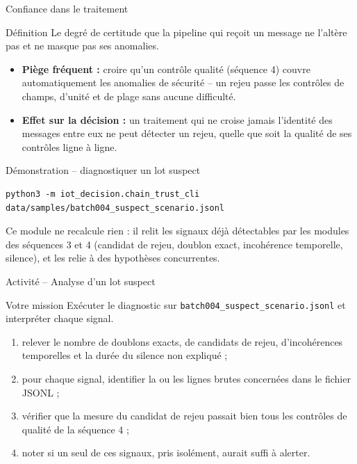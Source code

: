 \documentclass[aspectratio=169]{beamer}
\begin{document}
\begin{frame}{Confiance dans le traitement}
  \begin{block}{Définition}
    Le degré de certitude que la pipeline qui reçoit un message ne l'altère pas et ne masque pas ses anomalies.
  \end{block}
  \begin{itemize}
    \item \textbf{Piège fréquent :} croire qu'un contrôle qualité (séquence 4) couvre automatiquement les anomalies de sécurité -- un rejeu passe les contrôles de champs, d'unité et de plage sans aucune difficulté.
    \item \textbf{Effet sur la décision :} un traitement qui ne croise jamais l'identité des messages entre eux ne peut détecter un rejeu, quelle que soit la qualité de ses contrôles ligne à ligne.
  \end{itemize}
\end{frame}

\begin{frame}[fragile]{Démonstration -- diagnostiquer un lot suspect}
  \scriptsize
  \begin{verbatim}
python3 -m iot_decision.chain_trust_cli data/samples/batch004_suspect_scenario.jsonl
  \end{verbatim}
  \normalsize
  Ce module ne recalcule rien : il relit les signaux déjà détectables par les modules des séquences 3 et 4 (candidat de rejeu, doublon exact, incohérence temporelle, silence), et les relie à des hypothèses concurrentes.
\end{frame}

\begin{frame}{Activité -- Analyse d'un lot suspect}
  \begin{block}{Votre mission}
    Exécuter le diagnostic sur \texttt{batch004\_suspect\_scenario.jsonl} et interpréter chaque signal.
  \end{block}
  \begin{enumerate}
    \item relever le nombre de doublons exacts, de candidats de rejeu, d'incohérences temporelles et la durée du silence non expliqué ;
    \item pour chaque signal, identifier la ou les lignes brutes concernées dans le fichier JSONL ;
    \item vérifier que la mesure du candidat de rejeu passait bien tous les contrôles de qualité de la séquence 4 ;
    \item noter si un seul de ces signaux, pris isolément, aurait suffi à alerter.
  \end{enumerate}
\end{frame}
\end{document}
